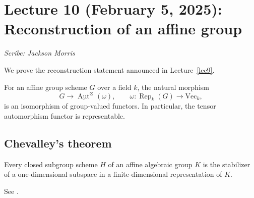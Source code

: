 \section{Lecture 10 (February 5, 2025): Reconstruction of an affine group}\label{lec10}
\noindent\textit{Scribe: Jackson Morris}
\label{lec?(2-5)}

We prove the reconstruction statement announced in Lecture~\ref{lec9}.
\begin{theorem}\label{thm:group-reconstruction}
For an affine group scheme $G$ over a field $k$, the natural morphism
\[
 G\longrightarrow\underline{\operatorname{Aut}}^{\otimes}(\omega),
 \qquad \omega:\operatorname{Rep}_k(G)\to\mathrm{Vec}_k,
\]
is an isomorphism of group-valued functors. In particular, the tensor automorphism functor is representable.
\end{theorem}

\subsection*{Chevalley's theorem}
\begin{theorem}[Chevalley]
Every closed subgroup scheme $H$ of an affine algebraic group $K$ is the
stabilizer of a one-dimensional subspace in a finite-dimensional
representation of $K$.
\end{theorem}
See \cite[Chapter VIII, Theorem 13.1]{milneAGS}.

